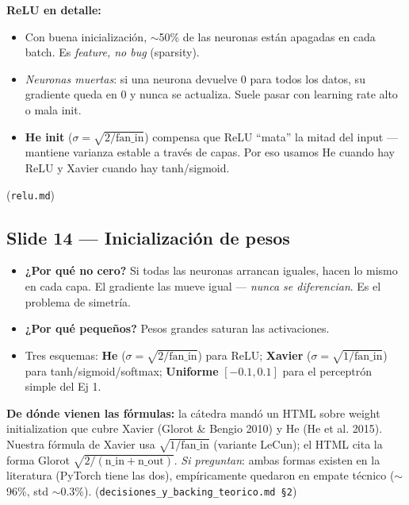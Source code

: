 \documentclass[11pt,a4paper]{article}
\newcommand{\nref}[1]{\textcolor{muted}{\small(\texttt{#1})}}
\begin{document}
\begin{nota}
\textbf{ReLU en detalle:}
\begin{itemize}[leftmargin=*,topsep=2pt]
  \item Con buena inicialización, $\sim$50\% de las neuronas están apagadas en
        cada batch. Es \emph{feature, no bug} (sparsity).
  \item \emph{Neuronas muertas}: si una neurona devuelve 0 para todos los
        datos, su gradiente queda en 0 y nunca se actualiza. Suele pasar con
        learning rate alto o mala init.
  \item \textbf{He init} ($\sigma = \sqrt{2/\text{fan\_in}}$) compensa que ReLU
        ``mata'' la mitad del input — mantiene varianza estable a través de
        capas. Por eso usamos He cuando hay ReLU y Xavier cuando hay
        tanh/sigmoid.
\end{itemize}
\nref{relu.md}
\end{nota}

\subsection{Slide 14 — Inicialización de pesos}

\begin{decir}
\begin{itemize}[leftmargin=*,topsep=0pt]
  \item \textbf{¿Por qué no cero?} Si todas las neuronas arrancan iguales, hacen
        lo mismo en cada capa. El gradiente las mueve igual — \emph{nunca se
        diferencian}. Es el problema de simetría.
  \item \textbf{¿Por qué pequeños?} Pesos grandes saturan las activaciones.
  \item Tres esquemas: \textbf{He} ($\sigma = \sqrt{2/\text{fan\_in}}$) para
        ReLU; \textbf{Xavier} ($\sigma = \sqrt{1/\text{fan\_in}}$) para
        tanh/sigmoid/softmax; \textbf{Uniforme} $[-0.1, 0.1]$ para el perceptrón
        simple del Ej 1.
\end{itemize}
\end{decir}

\begin{nota}
\textbf{De dónde vienen las fórmulas:} la cátedra mandó un HTML sobre weight
initialization que cubre Xavier (Glorot \& Bengio 2010) y He (He et al. 2015).
Nuestra fórmula de Xavier usa $\sqrt{1/\text{fan\_in}}$ (variante LeCun); el
HTML cita la forma Glorot $\sqrt{2/(\text{n\_in}+\text{n\_out})}$. \emph{Si
preguntan}: ambas formas existen en la literatura (PyTorch tiene las dos),
empíricamente quedaron en empate técnico ($\sim$96\%, std $\sim 0.3\%$).
\nref{decisiones\_y\_backing\_teorico.md \S 2}
\end{nota}
\end{document}
